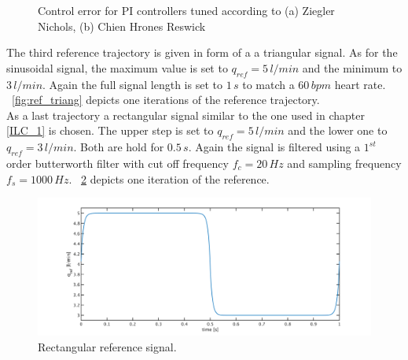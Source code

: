 \begin{figure}[ht]
  \centering
  \caption[Control error for PI Controllers]{Control error for PI controllers tuned according to (a) Ziegler Nichols, (b) Chien Hrones Reswick}
  \label{fig:ref_signals}
\end{figure}
The third reference trajectory is given in form of a a triangular signal. As for the sinusoidal signal, the maximum value is set to $q_{ref}=5\,l/min$ and the minimum to $3\, l/min$. Again the full signal length is set to $1\,s$ to match a $60\,bpm$ heart rate. \figurename~\ref{fig:ref_triang} depicts one iterations of the reference trajectory.
\\As a last trajectory a rectangular signal similar to the one used in chapter \ref{ILC_1} is chosen. The upper step is set to $q_{ref}=5\,l/min$ and the lower one to $q_{ref}=3\,l/min$. Both are hold for $0.5\,s$. Again the signal is filtered using a $1^{st}$ order butterworth filter with cut off frequency $f_c=20\,Hz$ and sampling frequency $f_s=1000\,Hz$. \figurename~\ref{fig:ref_square} depicts one iteration of the reference.
\begin{figure}[ht]
  \centering
  \includegraphics[width=\textwidth]{images/chapt_5/ILC/ref_square.pdf}
  \caption[Rectangular reference signal]{Rectangular reference signal.}
  \label{fig:ref_square}
\end{figure}
%

